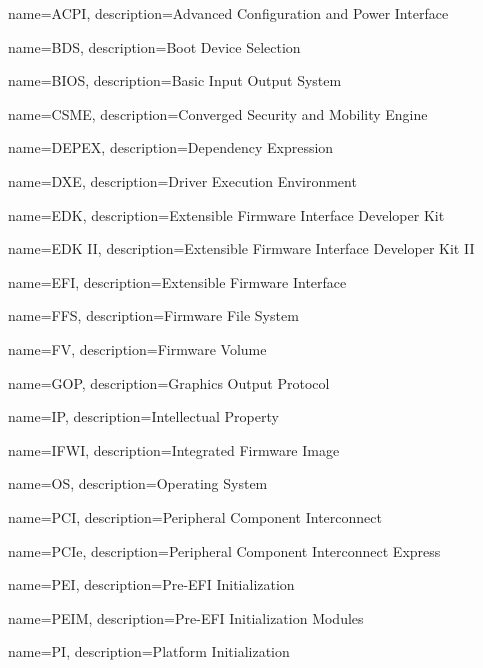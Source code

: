  {
	name={ACPI},
	description={Advanced Configuration and Power Interface
	}
}

 {
	name={BDS},
	description={Boot Device Selection
	}
}

 {
    name=BIOS,
    description={Basic Input Output System
    }
}


 {
    name=CSME,
    description={Converged Security and Mobility Engine
    }
}

 {
	name=DEPEX,
	description={Dependency Expression
	}
}


 {
	name=DXE,
	description={Driver Execution Environment
	}
}

 {
	name=EDK,
	description={Extensible Firmware Interface Developer Kit
	}
}

 {
	name=EDK II,
	description={Extensible Firmware Interface Developer Kit II
	}
}

 {
	name=EFI,
	description={Extensible Firmware Interface
	}
}

 {
    name=FFS,
    description={Firmware File System
    }
}

 {
    name=FV,
    description={Firmware Volume
    }
}

 {
    name=GOP,
    description={Graphics Output Protocol
    }
}

 {
    name=IP,
    description={Intellectual Property
    }
}

 {
    name=IFWI,
    description={Integrated Firmware Image
    }
}

 {
	name=OS,
	description={Operating System
	}
}

 {
	name=PCI,
	description={Peripheral Component Interconnect
	}
}

 {
	name=PCIe,
	description={Peripheral Component Interconnect Express
	}
}

 {
    name=PEI,
    description={Pre-EFI Initialization
    }
}

 {
    name=PEIM,
    description={Pre-EFI Initialization Modules
    }
}

 {
	name=PI,
	description={Platform Initialization
	}
}

